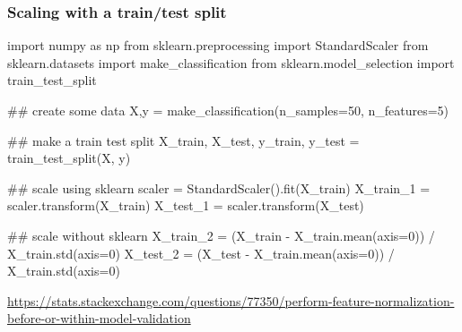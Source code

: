 \documentclass[table,dvipsnames]{beamer}
\begin{document}
\begin{frame}[fragile]
\frametitle{Scaling with a train/test split}
\scriptsize
\begin{code}
import numpy as np
from sklearn.preprocessing import StandardScaler
from sklearn.datasets import make_classification
from sklearn.model_selection import train_test_split

## create some data                                                                                                                                                                                                
X,y = make_classification(n_samples=50, n_features=5)

## make a train test split                                                                                                                                                                                         
X_train, X_test, y_train, y_test = train_test_split(X, y)

## scale using sklearn                                                                                                                                                                                             
scaler = StandardScaler().fit(X_train)
X_train_1 = scaler.transform(X_train)
X_test_1 = scaler.transform(X_test)

## scale without sklearn                                                                                                                                                                                           
X_train_2 = (X_train - X_train.mean(axis=0)) / X_train.std(axis=0)
X_test_2 = (X_test - X_train.mean(axis=0)) / X_train.std(axis=0)
\end{code}
\begin{flushleft}
 \tiny{\href{https://stats.stackexchange.com/questions/77350/perform-feature-normalization-before-or-within-model-validation}{https://stats.stackexchange.com/questions/77350/perform-feature-normalization-before-or-within-model-validation}}
\end{flushleft}
\end{frame}
\end{document}

